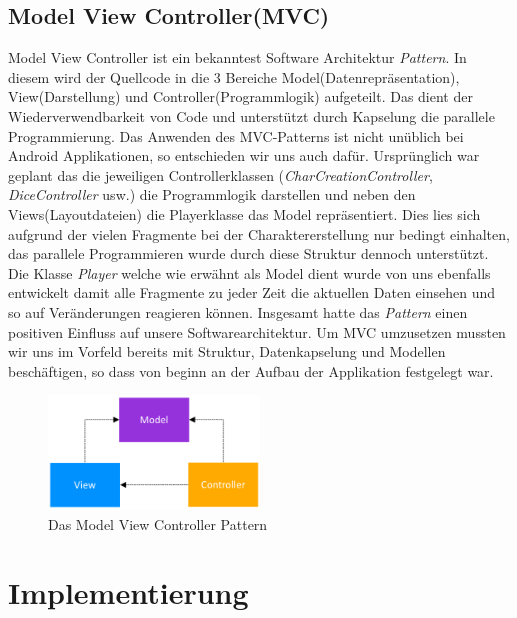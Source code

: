\subsection{Model View Controller(MVC)}
Model View Controller\cite{mvc} ist ein bekanntest Software Architektur \textit{Pattern}. In diesem wird der Quellcode in die 3 Bereiche Model(Datenrepräsentation), View(Darstellung) und Controller(Programmlogik) aufgeteilt. Das dient der Wiederverwendbarkeit von Code und unterstützt durch Kapselung die parallele Programmierung.
\newline Das Anwenden des MVC-Patterns ist nicht unüblich bei Android Applikationen, so entschieden wir uns auch dafür. Ursprünglich war geplant das die jeweiligen Controllerklassen (\textit{CharCreationController}, \textit{DiceController} usw.) die Programmlogik darstellen und neben den Views(Layoutdateien) die Playerklasse das Model repräsentiert. Dies lies sich aufgrund der vielen Fragmente bei der Charaktererstellung nur bedingt einhalten, das parallele Programmieren wurde durch diese Struktur dennoch unterstützt.
\newline Die Klasse \textit{Player} welche wie erwähnt als Model dient wurde von uns ebenfalls entwickelt damit alle Fragmente zu jeder Zeit die aktuellen Daten einsehen und so auf Veränderungen reagieren können. Insgesamt hatte das \textit{Pattern} einen positiven Einfluss auf unsere Softwarearchitektur. Um MVC umzusetzen mussten wir uns im Vorfeld bereits mit Struktur, Datenkapselung und Modellen beschäftigen, so dass von beginn an der Aufbau der Applikation festgelegt war.\\
\begin{figure}
	\centering
	\includegraphics[width=0.5\textwidth]{images/mvc.png}
	\caption{Das Model View Controller Pattern}
\end{figure}

\newpage
\section{Implementierung}

